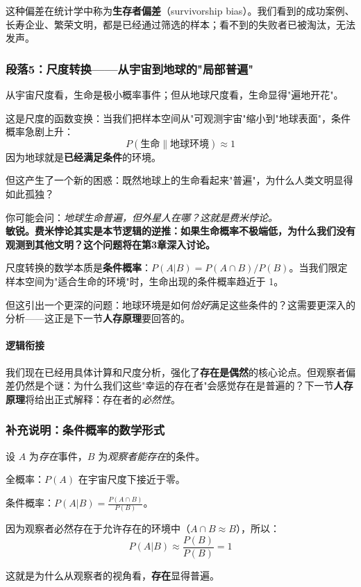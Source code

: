 \documentclass[../main.tex]{subfiles}
\begin{document}
	这种偏差在统计学中称为\textbf{生存者偏差}（survivorship bias）。我们看到的成功案例、长寿企业、繁荣文明，都是已经通过筛选的样本；看不到的失败者已被淘汰，无法发声。

	\subsubsection*{段落5：尺度转换——从宇宙到地球的"局部普遍"}
	从宇宙尺度看，生命是极小概率事件；但从地球尺度看，生命显得"遍地开花"。

	这是尺度的函数变换：当我们把样本空间从"可观测宇宙"缩小到"地球表面"，条件概率急剧上升：
	\[ P(生命 \| 地球环境) \approx 1 \]
	因为地球就是\textbf{已经满足条件}的环境。

	但这产生了一个新的困惑：既然地球上的生命看起来"普遍"，为什么人类文明显得如此孤独？

	\begin{tcolorbox}[colback=yellow!5, title=\textit{读者行为预测}]
		你可能会问：\textit{地球生命普遍，但外星人在哪？这就是费米悖论。}\\
		\textbf{敏锐。费米悖论其实是本节逻辑的逆推：如果生命概率不极端低，为什么我们没有观测到其他文明？这个问题将在第3章深入讨论。}
	\end{tcolorbox}

	尺度转换的数学本质是\textbf{条件概率}：$P(A|B) = P(A \cap B) / P(B)$。当我们限定样本空间为"适合生命的环境"时，生命出现的条件概率趋近于 1。

	但这引出一个更深的问题：地球环境是如何\textit{恰好}满足这些条件的？这需要更深入的分析——这正是下一节\textbf{人存原理}要回答的。

	\paragraph*{逻辑衔接}
	我们现在已经用具体计算和尺度分析，强化了\textbf{存在是偶然}的核心论点。但观察者偏差仍然是个谜：为什么我们这些"幸运的存在者"会感觉存在是普遍的？下一节\textbf{人存原理}将给出正式解释：存在者的\textit{必然性}。

	\subsubsection*{补充说明：条件概率的数学形式}
	\begin{tcolorbox}[
		colback=gray!5,
		colframe=gray!40,
		title=\small \textit{严谨推导（可跳过）},
		fonttitle=\bfseries
		]
		\small
		设 $A$ 为\textit{存在}事件，$B$ 为\textit{观察者能存在}的条件。

		全概率：$P(A)$ 在宇宙尺度下接近于零。

		条件概率：$P(A|B) = \frac{P(A \cap B)}{P(B)}$。

		因为观察者必然存在于允许存在的环境中（$A \cap B \approx B$），所以：
		\[ P(A|B) \approx \frac{P(B)}{P(B)} = 1 \]

		这就是为什么从观察者的视角看，\textbf{存在}显得普遍。
	\end{tcolorbox}
\end{document}
